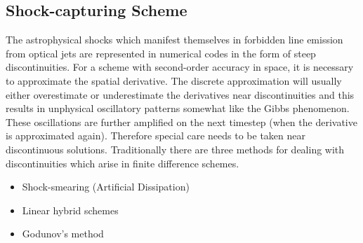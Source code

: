 \subsection{Shock-capturing Scheme}

The astrophysical shocks which manifest themselves in forbidden line emission
from optical jets are represented in numerical codes in the form of steep
discontinuities.
For a scheme with second-order accuracy in space, it is necessary to approximate the spatial derivative.
The discrete approximation will usually either overestimate or underestimate
the derivatives near discontinuities and this results in unphysical oscillatory
patterns somewhat like the Gibbs phenomenon.
These oscillations are further amplified on the next timestep (when the derivative is approximated again).
Therefore special care needs to be taken near discontinuous solutions.
Traditionally there are three methods for dealing with discontinuities which arise in finite difference schemes.
\begin{itemize}
\item Shock-smearing (Artificial Dissipation)
\item Linear hybrid schemes
\item Godunov's method
\end{itemize}

